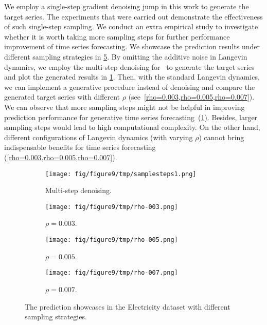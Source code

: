 We employ a single-step gradient denoising jump in this work to generate the target series. 
The experiments that were carried out demonstrate the effectiveness of such single-step sampling. 
We conduct an extra empirical study to investigate whether it is worth taking more sampling steps for further performance improvement of time series forecasting. 
We showcase the prediction results under different sampling strategies in \cref{fig:sample}. 
By omitting the additive noise in Langevin dynamics, we employ the multi-step denoising for \ourmodel~to generate the target series and plot the generated results in \cref{steps}. 
Then, with the standard Langevin dynamics, we can implement a generative procedure instead of denoising and compare the generated target series with different $\rho$ (see~\cref{rho=0.003,rho=0.005,rho=0.007}). 
We can observe that more sampling steps might not be helpful in improving prediction performance for generative time series forecasting~(\cref{steps}). 
Besides, larger sampling steps would lead to high computational complexity. 
On the other hand, different configurations of Langevin dynamics (with varying $\rho$) cannot bring indispensable benefits for time series forecasting (\cref{rho=0.003,rho=0.005,rho=0.007}). 

\begin{figure}[ht]
    \centering
      \begin{subfigure}[t]{0.24\textwidth}
      \centering
       \texttt{[image: fig/figure9/tmp/samplesteps1.png]}
       \caption{
       Multi-step denoising.
       }
       \label{steps}
      \end{subfigure}
      \begin{subfigure}[t]{0.24\textwidth}
      \centering
       \texttt{[image: fig/figure9/tmp/rho-003.png]}
       \caption{$\rho = 0.003$.}
       \label{rho=0.003}
      \end{subfigure}
     \begin{subfigure}[t]{0.24\textwidth}
        \centering
       \texttt{[image: fig/figure9/tmp/rho-005.png]}
       \caption{$\rho = 0.005$.}
       \label{rho=0.005}
      \end{subfigure}
      \begin{subfigure}[t]{0.24\textwidth}
      \centering
       \texttt{[image: fig/figure9/tmp/rho-007.png]}
       \caption{$\rho = 0.007$.}
       \label{rho=0.007}
      \end{subfigure}
      \caption{
      The prediction showcases in the Electricity dataset with different sampling strategies.
      }
     \label{fig:sample}
\end{figure}
 

